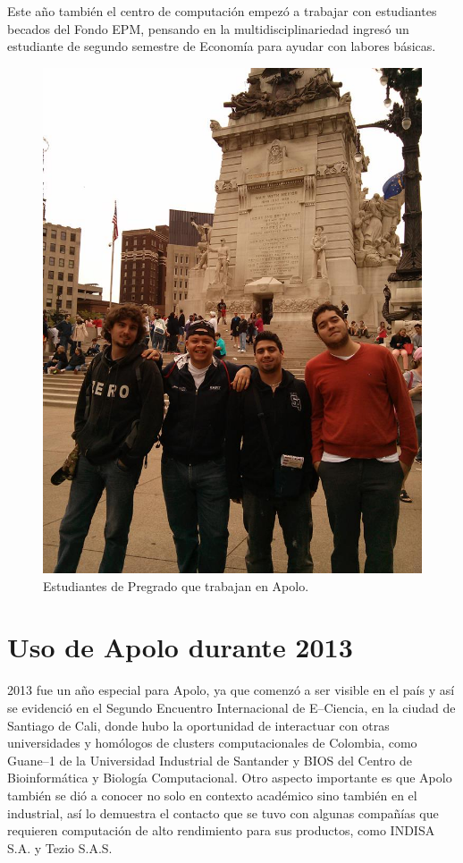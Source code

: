 Este año también el centro de computación empezó a trabajar con estudiantes becados del Fondo EPM, pensando en la multidisciplinariedad ingresó un estudiante de segundo semestre de Economía para ayudar con labores básicas.

\begin{figure}[ht]
  \centering
  \includegraphics[scale=0.3]{imgs/loscuatro2.jpg}
  \caption{Estudiantes de Pregrado que trabajan en Apolo.}
  \label{fig:guys}
\end{figure}


\section{Uso de Apolo durante 2013}
2013 fue un año especial para Apolo, ya que comenzó a ser visible en el país y así se evidenció en el Segundo Encuentro Internacional de E--Ciencia, en la ciudad de Santiago de Cali, donde hubo la oportunidad de interactuar con otras universidades y homólogos de clusters computacionales de Colombia, como Guane--1 de la Universidad Industrial de Santander y BIOS del Centro de Bioinformática y Biología Computacional. Otro aspecto importante es que Apolo también se dió a conocer no solo en contexto académico sino también en el industrial, así lo demuestra el contacto que se tuvo con algunas compañías que requieren computación de alto rendimiento para sus productos, como INDISA S.A. y Tezio S.A.S.


